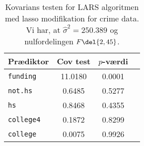 \begin{table}[ht] 
\centering 
\begin{tabular}{lccc}
\toprule
Prædiktor & Cov test & \(p\)-værdi \\
\midrule
\texttt{funding} & 11.0180 & 0.0001 \\ 
\texttt{not.hs} & 0.6485 & 0.5277 \\
\texttt{hs} & 0.8468 & 0.4355 \\
\texttt{college4} & 0.1872 & 0.8299 \\
\texttt{college} & 0.0075 & 0.9926 \\ \bottomrule
\end{tabular}
\caption{Kovarians testen for LARS algoritmen med lasso modifikation for crime data. Vi har, at \(\widehat{\sigma}^2 = 250.389\) og nulfordelingen \(F \del{2,45}\).} \label{tab:crime_covTest}
\end{table} 